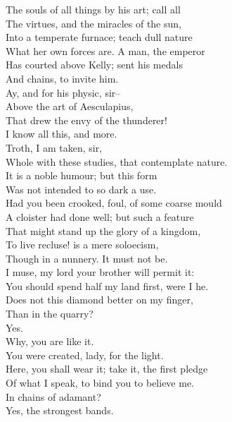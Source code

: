 \documentclass{memoir}
\begin{document}
\begin{drama*}
 The souls of all things by his art; call all\\
 The virtues, and the miracles of the sun,\\
 Into a temperate furnace; teach dull nature\\
 What her own forces are. A man, the emperor\\
 Has courted above Kelly; sent his medals\\
 And chains, to invite him.\\
\dolspeaks {} Ay, and for his physic, sir--\\
\mammonspeaks  Above the art of Aesculapius,\\
 That drew the envy of the thunderer!\\
 I know all this, and more.\\
\dolspeaks {} Troth, I am taken, sir,\\
 Whole with these studies, that contemplate nature.\\
\mammonspeaks  It is a noble humour; but this form\\
 Was not intended to so dark a use.\\
 Had you been crooked, foul, of some coarse mould\\
 A cloister had done well; but such a feature\\
 That might stand up the glory of a kingdom,\\
 To live recluse! is a mere soloecism,\\
 Though in a nunnery. It must not be.\\
 I muse, my lord your brother will permit it:\\
 You should spend half my land first, were I he.\\
 Does not this diamond better on my finger,\\
 Than in the quarry?\\
\dolspeaks {} Yes.\\
\mammonspeaks {} Why, you are like it.\\
 You were created, lady, for the light.\\
 Here, you shall wear it; take it, the first pledge\\
 Of what I speak, to bind you to believe me.\\
\dolspeaks  In chains of adamant?\\
\mammonspeaks {} Yes, the strongest bands.\\

\end{drama*}
\end{document}
